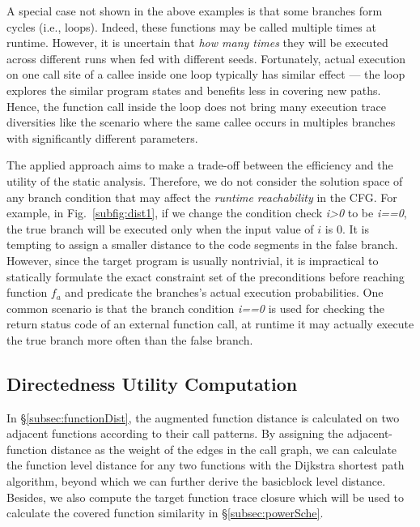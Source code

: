 A special case not shown in the above examples is that some branches form cycles (i.e., loops). Indeed, these functions may be called multiple times at runtime. However, it is uncertain that \emph{how many times} they will be executed across different runs when fed with different seeds. Fortunately, actual execution on one call site of a callee inside one loop typically has similar effect --- the loop explores the similar program states and benefits less in covering new paths. Hence, the function call inside the loop does not bring many execution trace diversities like the scenario where the same callee occurs in multiples branches with significantly different parameters.

The applied approach aims to make a trade-off between the efficiency and the utility of the static analysis. Therefore, we do not consider the solution space of any branch condition that may affect the \emph{runtime reachability} in the CFG. For example, in Fig.~\ref{subfig:dist1}, if we change the condition check \emph{i>0} to be \emph{i==0}, the true branch will be executed only when the input value of $i$ is 0. It is tempting to assign a smaller distance to the code segments in the false branch. However, since the target program is usually nontrivial, it is impractical to statically formulate the exact constraint set of the preconditions before reaching function $f_a$ and predicate the branches's actual execution probabilities. One common scenario is that the branch condition \emph{i==0} is used for checking the return status code of an external function call, at runtime it may actually execute the true branch more often than the false branch.




\subsection{Directedness Utility Computation} \label{subsec:UtilityComputation}

In \S\ref{subsec:functionDist}, the augmented function distance is calculated on two adjacent functions according to their call patterns. By assigning  the adjacent-function distance as the weight of the edges in the call graph, we can calculate the function level distance for any two functions with the Dijkstra shortest path algorithm, beyond which we can further derive the 
basicblock level distance. 
Besides, we also compute the target function trace closure which will be used to calculate the covered function similarity in \S\ref{subsec:powerSche}.

